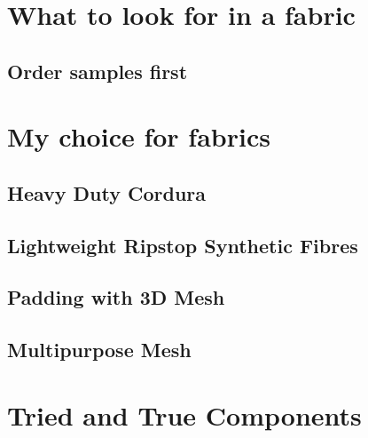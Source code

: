 \section{What to look for in a fabric}


\subsection{Order samples first}



\section{My choice for fabrics}

\subsection{Heavy Duty Cordura}


\subsection{Lightweight Ripstop Synthetic Fibres}


\subsection{Padding with 3D Mesh}


\subsection{Multipurpose Mesh}


\section{Tried and True Components}

